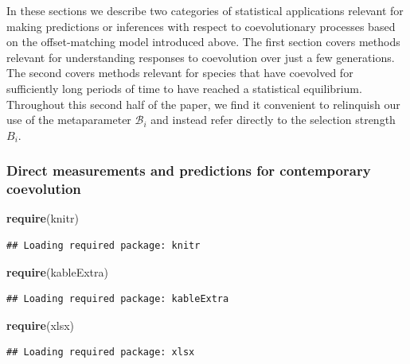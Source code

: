 \documentclass[]{article}
\newenvironment{Shaded}{\begin{snugshade}}{\end{snugshade}}
\newcommand{\KeywordTok}[1]{\textcolor[rgb]{0.13,0.29,0.53}{\textbf{#1}}}
\newcommand{\NormalTok}[1]{#1}
\begin{document}
In these sections we describe two categories of statistical applications
relevant for making predictions or inferences with respect to
coevolutionary processes based on the offset-matching model introduced
above. The first section covers methods relevant for understanding
responses to coevolution over just a few generations. The second covers
methods relevant for species that have coevolved for sufficiently long
periods of time to have reached a statistical equilibrium. Throughout
this second half of the paper, we find it convenient to relinquish our
use of the metaparameter \(\mathscr{B}_i\) and instead refer directly to
the selection strength \(B_i\).

\hypertarget{direct-measurements-and-predictions-for-contemporary-coevolution}{%
\subsubsection{Direct measurements and predictions for contemporary
coevolution}\label{direct-measurements-and-predictions-for-contemporary-coevolution}}

\begin{Shaded}
\begin{Highlighting}[]
\KeywordTok{require}\NormalTok{(knitr)}
\end{Highlighting}
\end{Shaded}

\begin{verbatim}
## Loading required package: knitr
\end{verbatim}

\begin{Shaded}
\begin{Highlighting}[]
\KeywordTok{require}\NormalTok{(kableExtra)}
\end{Highlighting}
\end{Shaded}

\begin{verbatim}
## Loading required package: kableExtra
\end{verbatim}

\begin{Shaded}
\begin{Highlighting}[]
\KeywordTok{require}\NormalTok{(xlsx)}
\end{Highlighting}
\end{Shaded}

\begin{verbatim}
## Loading required package: xlsx
\end{verbatim}
\end{document}
